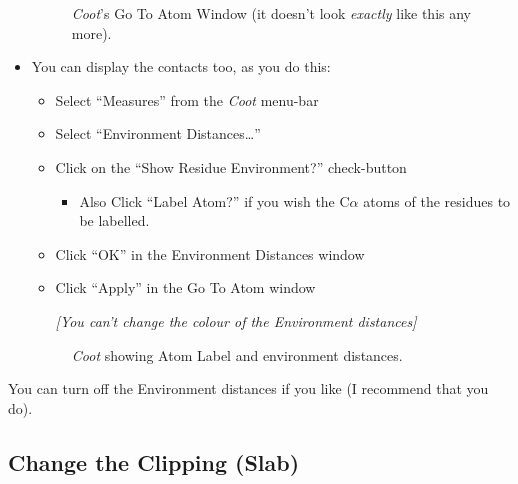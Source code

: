 \documentclass{article}
\begin{document}
\begin{itemize}
\begin{figure}[htbp]
  \begin{center}
    \leavevmode
    \epsfxsize 60mm

    {\emph{Coot}'s Go To Atom Window (it doesn't look \emph{exactly} like this any more).}
    \label{fig:goto-atom}
  \end{center}
\end{figure}

\item You can display the contacts too, as you do this:

  \begin{itemize}
  \item Select \textsf{``Measures''} from the \emph{Coot} menu-bar
  \item Select \textsf{``Environment Distances\ldots''}
  \item Click on the \textsf{``Show Residue Environment?''} check-button
    \begin{itemize}
    \item Also Click \textsf{``Label Atom?''} if you wish the
      C$\alpha$ atoms of the residues to be labelled.
    \end{itemize}
  \item Click \textsf{``OK''} in the Environment Distances window
  \item Click \textsf{``Apply''} in the Go To Atom window

    \emph{[You can't change the colour of the Environment distances]}
  \end{itemize}

  \begin{figure}[htbp]
    \begin{center}
      \leavevmode
      \epsfxsize 70mm
      \caption{\emph{Coot} showing Atom Label and environment distances.}
      \label{fig:environment}
    \end{center}
  \end{figure}
\end{itemize}

You can turn off the Environment distances if you like (I recommend that you do).

\subsection{Change the Clipping (Slab)}
\end{document}

